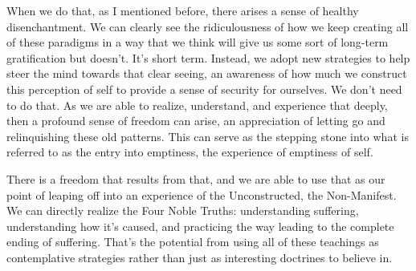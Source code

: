 When we do that, as I mentioned before, there arises a sense of healthy disenchantment. We can clearly see the ridiculousness of how we keep creating all of these paradigms in a way that we think will give us some sort of long-term gratification but doesn't. It's short term. Instead, we adopt new strategies to help steer the mind towards that clear seeing, an awareness of how much we construct this perception of self to provide a sense of security for ourselves. We don't need to do that. As we are able to realize, understand, and experience that deeply, then a profound sense of freedom can arise, an appreciation of letting go and relinquishing these old patterns. This can serve as the stepping stone into what is referred to as the entry into emptiness, the experience of emptiness of self.

There is a freedom that results from that, and we are able to use that as our point of leaping off into an experience of the Unconstructed, the Non-Manifest. We can directly realize the Four Noble Truths: understanding suffering, understanding how it's caused, and practicing the way leading to the complete ending of suffering. That's the potential from using all of these teachings as contemplative strategies rather than just as interesting doctrines to believe in.

